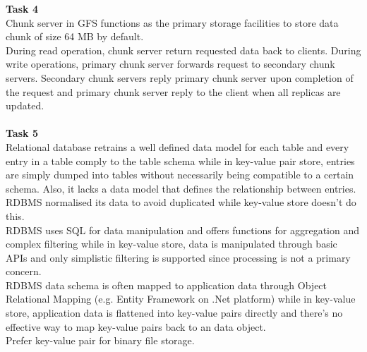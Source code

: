 \setlength{\parindent}{0pt}\textbf{\huge Task 4}\\

Chunk server in GFS functions as the primary storage facilities to store data chunk of size 64 MB by default.\\
During read operation, chunk server return requested data back to clients.
During write operations, primary chunk server forwards request to secondary chunk servers. Secondary chunk servers reply primary chunk server upon completion of the request and primary chunk server reply to the client when all replicas are updated.\\
\\

\setlength{\parindent}{0pt}\textbf{\huge Task 5}\\

Relational database retrains a well defined data model for each table and every entry in a table comply to the table schema while in key-value pair store, entries are simply dumped into tables without necessarily being compatible to a certain schema. Also, it lacks a data model that defines the relationship between entries.\\

RDBMS normalised its data to avoid duplicated while key-value store doesn’t do this.\\

RDBMS uses SQL for data manipulation and offers functions for aggregation and complex filtering while in key-value store, data is manipulated through basic APIs and only simplistic filtering is supported since processing is not a primary concern.\\

RDBMS data schema is often mapped to application data through Object Relational Mapping (e.g. Entity Framework on .Net platform) while in key-value store, application data is flattened into key-value pairs directly and there’s no effective way to map key-value pairs back to an data object.\\

Prefer key-value pair for binary file storage.\\